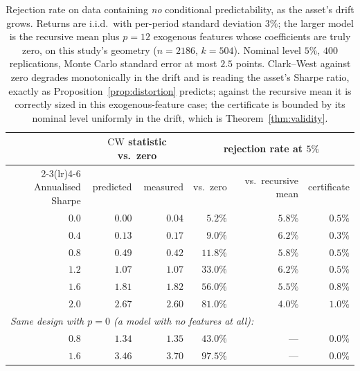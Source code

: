 \documentclass{article}
\theoremstyle{plain}
\theoremstyle{definition}
\begin{document}
\begin{table}[t]
  \centering
  \caption{Rejection rate on data containing \emph{no} conditional predictability, as the
  asset's drift grows. Returns are i.i.d.\ with per-period standard deviation $3\%$; the
  larger model is the recursive mean plus $p=12$ exogenous features whose coefficients are
  truly zero, on this study's geometry ($n=2186$, $k=504$). Nominal level $5\%$, $400$
  replications, Monte Carlo standard error at most $2.5$ points. Clark--West against zero
  degrades monotonically in the drift and is reading the asset's Sharpe ratio, exactly as
  Proposition~\ref{prop:distortion} predicts; against the recursive mean it is correctly
  sized in this exogenous-feature case; the certificate is bounded by its nominal level
  uniformly in the drift, which is Theorem~\ref{thm:validity}.}
  \label{tab:sweep}
  \small
  \begin{tabular}{rrrrrr}
    \toprule
    & \multicolumn{2}{c}{$\mathrm{CW}$ statistic vs.\ zero}
    & \multicolumn{3}{c}{rejection rate at $5\%$} \\
    \cmidrule(lr){2-3}\cmidrule(lr){4-6}
    Annualised Sharpe & predicted & measured
    & vs.\ zero & vs.\ recursive mean & certificate \\
    \midrule
    $0.0$ & $0.00$ & $0.04$ & $5.2\%$  & $5.8\%$ & $0.5\%$ \\
    $0.4$ & $0.13$ & $0.17$ & $9.0\%$  & $6.2\%$ & $0.3\%$ \\
    $0.8$ & $0.49$ & $0.42$ & $11.8\%$ & $5.8\%$ & $0.5\%$ \\
    $1.2$ & $1.07$ & $1.07$ & $33.0\%$ & $6.2\%$ & $0.5\%$ \\
    $1.6$ & $1.81$ & $1.82$ & $56.0\%$ & $5.5\%$ & $0.8\%$ \\
    $2.0$ & $2.67$ & $2.60$ & $81.0\%$ & $4.0\%$ & $1.0\%$ \\
    \midrule
    \multicolumn{6}{l}{\emph{Same design with $p=0$ (a model with no features at all):}} \\
    $0.8$ & $1.34$ & $1.35$ & $43.0\%$ & --- & $0.0\%$ \\
    $1.6$ & $3.46$ & $3.70$ & $97.5\%$ & --- & $0.0\%$ \\
    \bottomrule
  \end{tabular}
\end{table}
\end{document}
